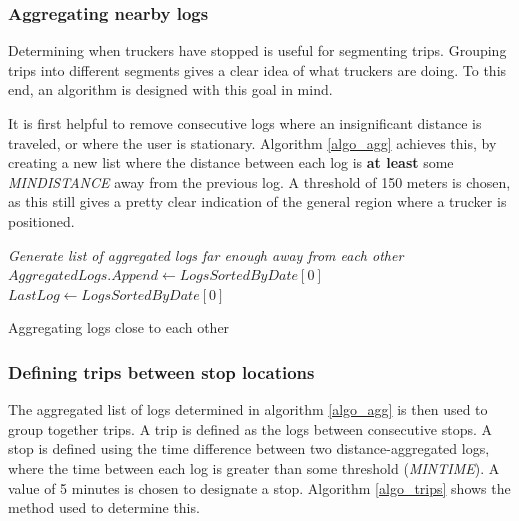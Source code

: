\subsubsection{Aggregating nearby logs}
Determining when truckers have stopped is useful for segmenting trips.
Grouping trips into different segments gives a clear idea of what truckers are doing.
To this end, an algorithm is designed with this goal in mind.

It is first helpful to remove consecutive logs where an insignificant distance is traveled, or where the user is stationary.
Algorithm \ref{algo_agg} achieves this, by creating a new list where the distance between each log is \textbf{at least} some \textit{MINDISTANCE} away from the previous log. A threshold of 150 meters is chosen, as this still gives a pretty clear indication of the general region where a trucker is positioned.


\begin{algorithm}

\BlankLine
\emph{Generate list of aggregated logs far enough away from each other}\;
$AggregatedLogs.Append \gets LogsSortedByDate[0]$\;
$LastLog \gets LogsSortedByDate[0]$\;
\caption{Aggregating logs close to each other}\label{algo_agg}
\end{algorithm}\DecMargin{1em} 

\subsubsection{Defining trips between stop locations}
The aggregated list of logs determined in algorithm \ref{algo_agg} is then used to group together trips.
A trip is defined as the logs between consecutive stops.
A stop is defined using the time difference between two distance-aggregated logs, where the time between each log is greater than some threshold (\textit{MINTIME}).
A value of 5 minutes is chosen to designate a stop.
Algorithm \ref{algo_trips} shows the method used to determine this.


